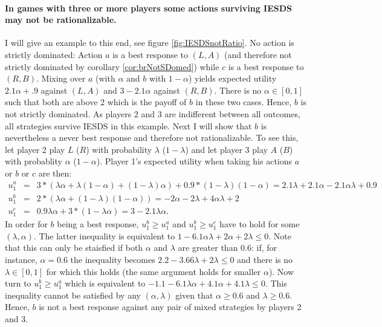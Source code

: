 \documentclass[a4paper,11pt]{article}
\begin{document}
\paragraph{In games with three or more players some actions surviving IESDS may not be rationalizable. }I will give an example to this end, see figure \ref{fig:IESDSnotRatio}. No action is strictly dominated: Action $a$ is a best response to $(L,A)$ (and therefore not strictly dominated by corollary \ref{cor:brNotSDomed}) while $c$ is a best response to $(R,B)$. Mixing over $a$ (with $\alpha$ and $b$ with $1-\alpha$) yields expected utility $2.1\alpha+.9$ against $(L,A)$ and $3-2.1\alpha$ against $(R,B)$. There is no $\alpha\in[0,1]$ such that both are above 2 which is the payoff of $b$ in these two cases. Hence, $b$ is not strictly dominated. As players 2 and 3 are indifferent between all outcomes, all strategies survive IESDS in this example. Next I will show that $b$ is nevertheless a never best response and therefore not rationalizable. To see this, let player 2 play $L$ ($R$) with probability $\lambda$ ($1-\lambda$) and let player 3 play $A$ ($B$) with probablity $\alpha$ ($1-\alpha$). Player 1's expected utility when taking his actions $a$ or $b$ or $c$ are then:
\begin{eqnarray*}
  u^a_1&=&3*(\lambda\alpha+\lambda(1-\alpha)+(1-\lambda)\alpha)+0.9*(1-\lambda)(1-\alpha)=2.1\lambda+2.1\alpha-2.1\alpha\lambda+0.9\\
  u_1^b&=&2*(\lambda\alpha+(1-\lambda)(1-\alpha))=-2\alpha-2\lambda+4\alpha\lambda+2\\
  u_1^c&=&0.9\lambda\alpha+3*(1-\lambda\alpha)=3-2.1\lambda\alpha.
\end{eqnarray*}
In order for $b$ being a best response, $u_1^b\geq u_1^a$ and $u_1^b\geq u_1^c$ have to hold for some $(\lambda,\alpha)$. The latter inequality is equivalent to $1-6.1\alpha\lambda+2\alpha+2\lambda\leq 0$. Note that this can only be staisfied if both $\alpha$ and $\lambda$ are greater than 0.6: if, for instance, $\alpha=0.6$ the inequality becomes $2.2-3.66\lambda+2\lambda\leq 0$ and there is no $\lambda\in[0,1]$ for which this holds (the same argument holds for smaller $\alpha$). Now turn to  $u_1^b\geq u_1^a$ which is equivalent to $-1.1-6.1\lambda\alpha+4.1\alpha+4.1\lambda\leq 0$. This inequality cannot be satisfied by any $(\alpha,\lambda)$ given that $\alpha\geq0.6$ and $\lambda\geq 0.6$. Hence, $b$ is not a best response against any pair of mixed strategies by players 2 and 3.
\end{document}
